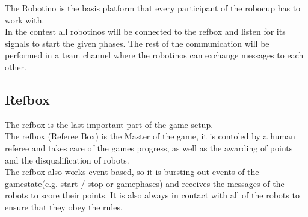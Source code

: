 The Robotino is the basis platform that every participant of the robocup has to work with.\\
In the contest all robotinos will be connected to the refbox and listen for its signals to start the given phases.
The rest of the communication will be performed in a team channel where the robotinos can exchange messages to each other.
\subsection{Refbox}
The refbox is the last important part of the game setup. \\
The refbox (Referee Box) is the Master of the game, it is contoled by a human referee and
takes care of the games progress, as well as the awarding of points and the disqualification of robots. \\
The refbox also works event based, so it is bursting out events of the gamestate(e.g. start / stop or gamephases)
and receives the messages of the robots to score their points.
It is also always in contact with all of the robots to ensure that they obey the rules.
